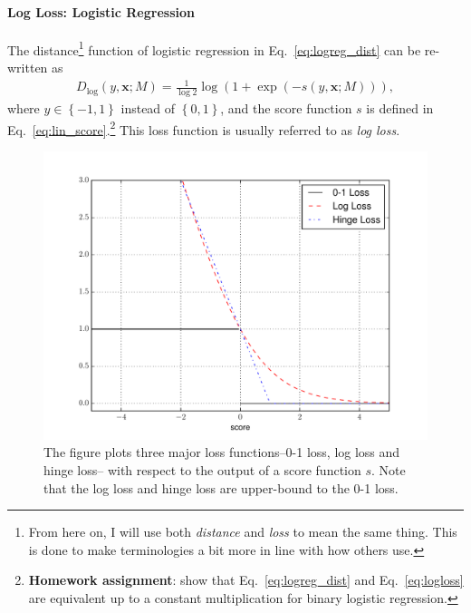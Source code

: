 \documentclass{report}
\newcommand{\vect}[1]{\mathbf{#1}}
\newcommand{\vx}[0]{\vect{x}}
\begin{document}
\paragraph{Log Loss: Logistic Regression}

The distance\footnote{
    From here on, I will use both {\it distance} and {\it loss} to mean the same
    thing. This is done to make terminologies a bit more in line with how
    others use.
}
function of logistic regression in Eq.~\eqref{eq:logreg_dist} can be re-written
as
\begin{align}
    \label{eq:logloss}
    D_{\log}(y, \vx; M) = \frac{1}{\log 2} \log(1+\exp(-s(y, \vx; M))),
\end{align}
where $y \in \left\{ -1, 1\right\}$ instead of $\left\{ 0, 1 \right\}$, and the
score function $s$ is defined in Eq.~\eqref{eq:lin_score}.\footnote{
    {\bf Homework assignment}: show that Eq.~\eqref{eq:logreg_dist} and
    Eq.~\eqref{eq:logloss} are equivalent up to a constant multiplication for
    binary logistic regression.
} This loss function is usually referred to as {\it log loss}.

\begin{figure}[t]
    \centering
    \begin{minipage}{0.6\textwidth}
        \raggedright
        \includegraphics[width=0.9\columnwidth,clip=True,trim=50 0 50 0]{figures/loss.pdf}
    \end{minipage}
    \begin{minipage}{0.39\textwidth}
        \raggedleft
        \caption{
            \label{fig:loss}
            The figure plots three major loss functions--0-1 loss, log loss and
            hinge loss-- with respect to the output of a score function $s$.
            Note that the log loss and hinge loss are upper-bound to the 0-1
            loss.
        }
    \end{minipage}
\end{figure}
\end{document}
